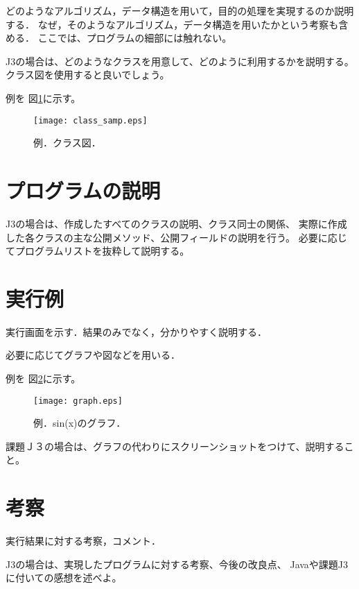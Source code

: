 \documentclass[11pt,a4j]{jarticle}
\begin{document}
どのようなアルゴリズム，データ構造を用いて，目的の処理を実現するのか説明する．
なぜ，そのようなアルゴリズム，データ構造を用いたかという考察も含める．
ここでは、プログラムの細部には触れない。

J3の場合は、どのようなクラスを用意して、どのように利用するかを説明する。
クラス図を使用すると良いでしょう。

例を 図\ref{fig:class}に示す。

\begin{figure}[htbp]
  \begin{center}
    \leavevmode
    \texttt{[image: class\_samp.eps]}
    \caption{例．クラス図．}
    \label{fig:class}
  \end{center}
\end{figure}

\section{プログラムの説明}
J3の場合は、作成したすべてのクラスの説明、クラス同士の関係、
実際に作成した各クラスの主な公開メソッド、公開フィールドの説明を行う。
必要に応じてプログラムリストを抜粋して説明する。

\section{実行例}
実行画面を示す．結果のみでなく，分かりやすく説明する．

必要に応じてグラフや図などを用いる．

例を 図\ref{fig:graph}に示す。

\begin{figure}[htbp]
  \begin{center}
    \leavevmode
    \texttt{[image: graph.eps]}
    \caption{例．sin(x)のグラフ．}
    \label{fig:graph}
  \end{center}
\end{figure}

課題Ｊ３の場合は、グラフの代わりにスクリーンショットをつけて、説明すること。

\section{考察}
実行結果に対する考察，コメント．

J3の場合は、実現したプログラムに対する考察、今後の改良点、
Javaや課題J3に付いての感想を述べよ。
\end{document}
